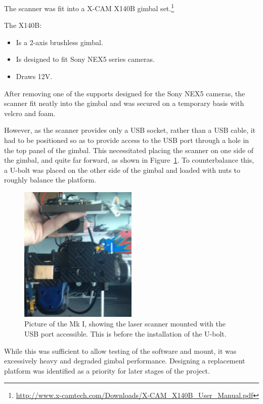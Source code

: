 \documentclass[12pt,oneside,a4paper]{book}
\begin{document}
The scanner was fit into a X-CAM X140B gimbal set.\footnote{\url{http://www.x-camtech.com/Downloads/X-CAM_X140B_User_Manual.pdf}}

The X140B:
\begin{itemize}
\item Is a 2-axis brushless gimbal.
\item Is designed to fit Sony NEX5 series cameras.
\item Draws 12V.
\end{itemize}

After removing one of the supports designed for the Sony NEX5 cameras,
the scanner fit neatly into the gimbal and was secured on a temporary
basis with velcro and foam.

However, as the scanner provides only a USB socket, rather than a USB
cable, it had to be positioned so as to provide access to the USB port
through a hole in the top panel of the gimbal. This necessitated
placing the scanner on one side of the gimbal, and quite far forward,
as shown in Figure~\ref{fig:mk1-mount}. To counterbalance this, a
U-bolt was placed on the other side of the gimbal and loaded with nuts
to roughly balance the platform.

\begin{figure}[h!]
  \centering
  \includegraphics[width=0.5\textwidth]{figs/mk1-mount}
  \caption{Picture of the Mk I, showing the laser scanner mounted with the USB port accessible. This is before the installation of the U-bolt.}
  \label{fig:mk1-mount}
\end{figure}

While this was sufficient to allow testing of the software and mount,
it was excessively heavy and degraded gimbal performance. Designing a
replacement platform was identified as a priority for later stages of the project.
\end{document}
